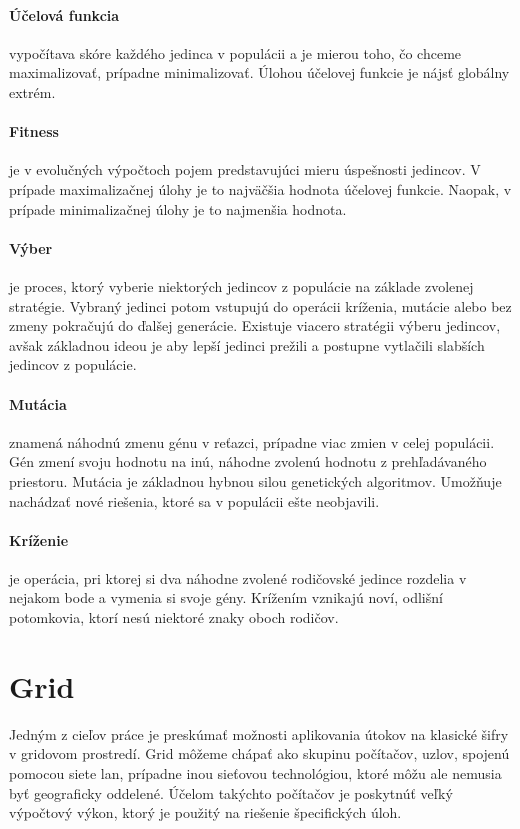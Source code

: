 \paragraph{Účelová funkcia} vypočítava skóre každého jedinca v populácii a je mierou toho, čo chceme maximalizovať, prípadne minimalizovať.
Úlohou účelovej funkcie je nájsť globálny extrém.

\paragraph{Fitness} je v evolučných výpočtoch pojem predstavujúci mieru úspešnosti jedincov.
V prípade maximalizačnej úlohy je to najväčšia hodnota účelovej funkcie. Naopak, v prípade minimalizačnej úlohy je to najmenšia hodnota.

\paragraph{Výber} je proces, ktorý vyberie niektorých jedincov z populácie na základe zvolenej stratégie.
Vybraný jedinci potom vstupujú do operácii kríženia, mutácie alebo bez zmeny pokračujú do ďalšej generácie.
Existuje viacero stratégii výberu jedincov, avšak základnou ideou je aby lepší jedinci prežili a postupne vytlačili slabších jedincov z populácie.

\paragraph{Mutácia} znamená náhodnú zmenu génu v reťazci, prípadne viac zmien v celej populácii.
Gén zmení svoju hodnotu na inú, náhodne zvolenú hodnotu z prehľadávaného priestoru.
Mutácia je základnou hybnou silou genetických algoritmov. Umožňuje nachádzať nové riešenia, ktoré sa v populácii ešte neobjavili.

\paragraph{Kríženie} je operácia, pri ktorej si dva náhodne zvolené rodičovské jedince rozdelia v nejakom bode a vymenia si svoje gény.
Krížením vznikajú noví, odlišní potomkovia, ktorí nesú niektoré znaky oboch rodičov.

\section{Grid}
Jedným z cieľov práce je preskúmať možnosti aplikovania útokov na klasické šifry v gridovom prostredí.
Grid môžeme chápať ako skupinu počítačov, uzlov, spojenú pomocou siete \acrfull{lan}, prípadne inou sieťovou technológiou,
ktoré môžu ale nemusia byť geograficky oddelené.
Účelom takýchto počítačov je poskytnúť veľký výpočtový výkon, ktorý je použitý na riešenie špecifických úloh.

